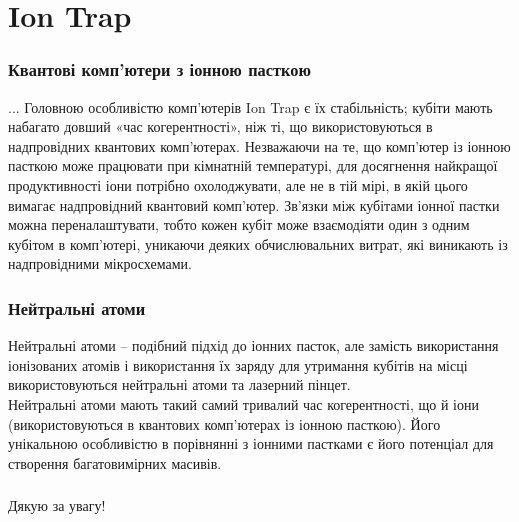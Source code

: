 \documentclass{beamer}
\begin{document}
\section{Ion Trap}
\usebackgroundtemplate{}
\begin{frame}
\frametitle{Квантові комп’ютери з іонною пасткою}
... Головною особливістю комп'ютерів Ion Trap є їх стабільність; кубіти мають набагато довший «час когерентності», ніж ті, що використовуються в надпровідних квантових комп’ютерах. Незважаючи на те, що комп’ютер із іонною пасткою може працювати при кімнатній температурі, для досягнення найкращої продуктивності іони потрібно охолоджувати, але не в тій мірі, в якій цього вимагає надпровідний квантовий комп’ютер. Зв'язки між кубітами іонної пастки можна переналаштувати, тобто кожен кубіт може взаємодіяти один з одним кубітом в комп'ютері, уникаючи деяких обчислювальних витрат, які виникають із надпровідними мікросхемами.
\end{frame}





\usebackgroundtemplate{}
\begin{frame}
\frametitle{Нейтральні атоми}
Нейтральні атоми – подібний підхід до іонних пасток, але замість використання іонізованих атомів і використання їх заряду для утримання кубітів на місці використовуються нейтральні атоми та лазерний пінцет.\\ 

Нейтральні атоми мають такий самий тривалий час когерентності, що й іони (використовуються в квантових комп’ютерах із іонною пасткою). Його унікальною особливістю в порівнянні з іонними пастками є його потенціал для створення багатовимірних масивів.
\end{frame}


\usebackgroundtemplate{}
\begin{frame}
\frametitle{}
\begin{center}
Дякую за увагу!
\end{center}
\end{frame}
\end{document}
